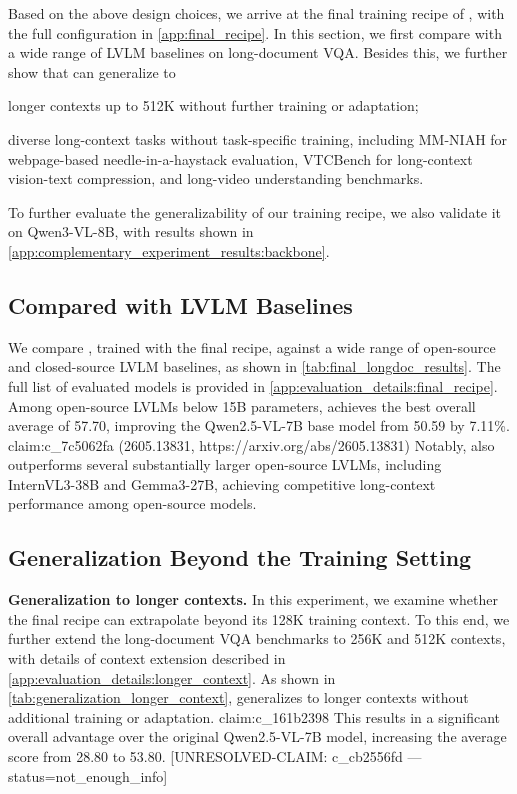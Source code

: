 Based on the above design choices, we arrive at the final training recipe of \modelname, with the full configuration in \cref{app:final_recipe}.
In this section, we first compare \modelname with a wide range of LVLM baselines on long-document VQA.
Besides this, we further show that \modelname can generalize to
\begin{inparaenum}[(i)]
\item longer contexts up to 512K without further training or adaptation;
\item diverse long-context tasks without task-specific training, including MM-NIAH for webpage-based needle-in-a-haystack evaluation, VTCBench for long-context vision-text compression, and long-video understanding benchmarks.
\end{inparaenum}
To further evaluate the generalizability of our training recipe, we also validate it on Qwen3-VL-8B, with results shown in \cref{app:complementary_experiment_results:backbone}.

\subsection{\modelname Compared with LVLM Baselines}
\label{sec:final_results:longdoc}

We compare \modelname, trained with the final recipe, against a wide range of open-source and closed-source LVLM baselines, as shown in \cref{tab:final_longdoc_results}.
The full list of evaluated models is provided in \cref{app:evaluation_details:final_recipe}.
Among open-source LVLMs below 15B parameters, \modelname achieves the best overall average of 57.70, improving the Qwen2.5-VL-7B base model from 50.59 by 7.11\%.
{{claim:c_7c5062fa}} (2605.13831, https://arxiv.org/abs/2605.13831)
Notably, \modelname also outperforms several substantially larger open-source LVLMs, including InternVL3-38B and Gemma3-27B, achieving competitive long-context performance among open-source models.\subsection{Generalization Beyond the Training Setting}
\label{sec:final_results:generalization}

\noindent\textbf{Generalization to longer contexts.} In this experiment, we examine whether the final \modelname recipe can extrapolate beyond its 128K training context.
To this end, we further extend the long-document VQA benchmarks to 256K and 512K contexts, with details of context extension described in \cref{app:evaluation_details:longer_context}.
As shown in \cref{tab:generalization_longer_context}, \modelname generalizes to longer contexts without additional training or adaptation.
{{claim:c_161b2398}}
This results in a significant overall advantage over the original Qwen2.5-VL-7B model, increasing the average score from 28.80 to 53.80. [UNRESOLVED-CLAIM: c_cb2556fd — status=not_enough_info]

